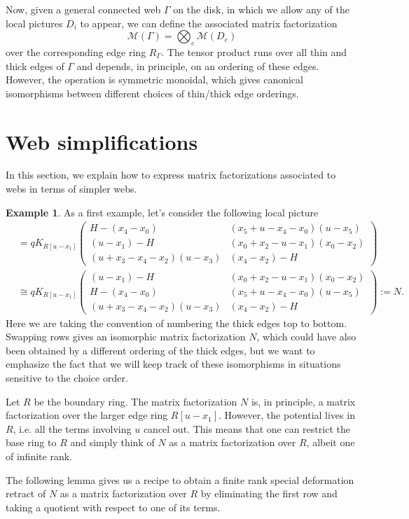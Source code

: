 \documentclass{article}
\newcommand{\maf}{\mathcal{M}}
\newcommand{\kmf}[2]{
	K_{#1}{\begin{pmatrix}
			#2
		\end{pmatrix}
	}	
}
\theoremstyle{plain} %
\theoremstyle{definition} %
\newtheorem{example}[theorem]{Example}
\theoremstyle{remark} %
\begin{document}
Now, given a general connected web $\Gamma$ on the disk, in which we allow any of the local pictures $D_i$ to appear, we can define the associated matrix factorization
$$
	\maf(\Gamma) =\bigotimes_e\maf(D_e)
$$
over the corresponding edge ring $R_\Gamma$. The tensor product runs over all thin and thick edges of $\Gamma$ and depends, in principle, on an ordering of these edges. However, the operation is symmetric monoidal, which gives canonical isomorphisms between different choices of thin/thick edge orderings.

\section{Web simplifications}

In this section, we explain how to express matrix factorizations associated to webs in terms of simpler webs. 

\begin{example}\label{tripleedge}
As a first example, let's consider the following local picture
\begin{align*}
	&
	=
	q\kmf{R[u-x_1]}{H-(x_4-x_0) & (x_5+u-x_4-x_0)(u-x_5) \\
		(u-x_1)-H & (x_0+x_2-u-x_1)(x_0-x_2) \\ 	
		(u+x_3-x_4-x_2)(u-x_3)& (x_4-x_2)-H 
	}
	\\
	&
	\cong
	q\kmf{R[u-x_1]}{(u-x_1)-H & (x_0+x_2-u-x_1)(x_0-x_2) \\ 
		H-(x_4-x_0) & (x_5+u-x_4-x_0)(u-x_5) \\	
		(u+x_3-x_4-x_2)(u-x_3)& (x_4-x_2)-H 
	}:=N
	.
\end{align*}
Here we are taking the convention of numbering the thick edges top to bottom. Swapping rows gives an isomorphic matrix factorization $N$, which could have also been obtained by a different ordering of the thick edges, but we want to emphasize the fact that we will keep track of these isomorphisms in situations sensitive to the choice order.

Let $R$ be the boundary ring. The matrix factorization $N$ is, in principle, a matrix factorization over the larger edge ring $R[u-x_1]$.  However, the potential lives in $R$, i.e. all the terms involving $u$ cancel out. This means that one can restrict the base ring to $R$ and simply think of $N$ as a matrix factorization over $R$, albeit one of infinite rank. 

The following lemma gives us a recipe to obtain a finite rank special deformation retract of $N$ as a matrix factorization over $R$ by eliminating the first row and taking a quotient with respect to one of its terms.
\end{example}
\end{document}
